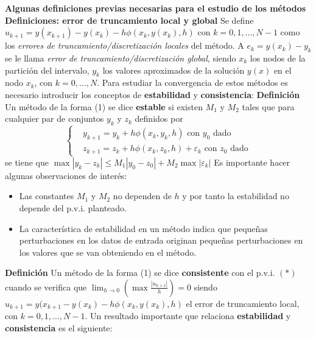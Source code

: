 \documentclass[paper=a4, fontsize=11pt]{scrartcl} %
\numberwithin{equation}{section}
\begin{document}
 	 \textbf{Algunas definiciones previas necesarias para el estudio de los métodos}\newline
 	 \newline\textbf{Definiciones: error de truncamiento local y global}\newline
 	 Se define
 	 \newline $u_{k+1}=y(x_{k+1})-y(x_k)-h\phi(x_k,y(x_k),h)$ con $k=0,1,...,N-1$ como los \textit{errores de truncamiento/discretización locales} del método. 
 	 \newline A $e_k=y(x_k)-y_k$ se le llama \textit{error de truncamiento/discretización global}, siendo $x_k$ los nodos de la partición del intervalo, $y_k$ los valores aproximados de la solución $y(x)$ en el nodo $x_k$, con $k=0,...,N$.
 	 \newline
 	 Para estudiar la convergencia de estos métodos es necesario introducir los conceptos de \textbf{estabilidad} y \textbf{consistencia}:\newline
 	 \newline\textbf{Definición}\newline
 	 Un método de la forma (1)
 	 se dice \textbf{estable} si existen $M_1$ y $M_2$ tales que para cualquier par de conjuntos ${y_k}$ y ${z_k}$ definidos por
 	 \begin{equation*}
 	 \begin{cases} 
 	 &\text{$y_{k+1} = y_k+h\phi(x_k,y_k,h)$   con $y_0$ dado}
 	 \\
 	 &\text{$z_{k+1} = z_k+h\phi(x_k,z_k,h)+\varepsilon_k$    con $z_0$ dado} 
 	 \end{cases} 
 	 \end{equation*}
 	 se tiene que\newline
 	 $\max|y_k-z_k|\leq M_1|y_0-z_0|+M_2\max|\varepsilon_k|$\newline
 	 \newline Es importante hacer algunas observaciones de interés:
 	 \begin{itemize}
 	 	\item Las constantes $M_1$ y $M_2$ no dependen de $h$ y por tanto la estabilidad no depende del p.v.i. planteado.
 	 	\item La característica de estabilidad en un método indica que pequeñas perturbaciones en los datos de entrada originan pequeñas perturbaciones en los valores que se van obteniendo en el método.
 	 \end{itemize}
 	 \textbf{Definición}\newline
 	 Un método de la forma (1)
 	 se dice \textbf{consistente} con el p.v.i. $(*)$ cuando se verifica que
 	 \newline
 	 $\lim_{h \rightarrow 0}(\max \frac{|u_{k+1}|}{h}) = 0$
 	 \newline
 	 siendo $u_{k+1}=y(x_{k+1}-y(x_k)-h\phi(x_k,y(x_k),h)$ el error de truncamiento local, con  $k=0,1,...,N-1$.\newline
 	 \newline
 	 Un resultado importante que relaciona \textbf{estabilidad} y \textbf{consistencia} es el siguiente:
 	 
\end{document}
